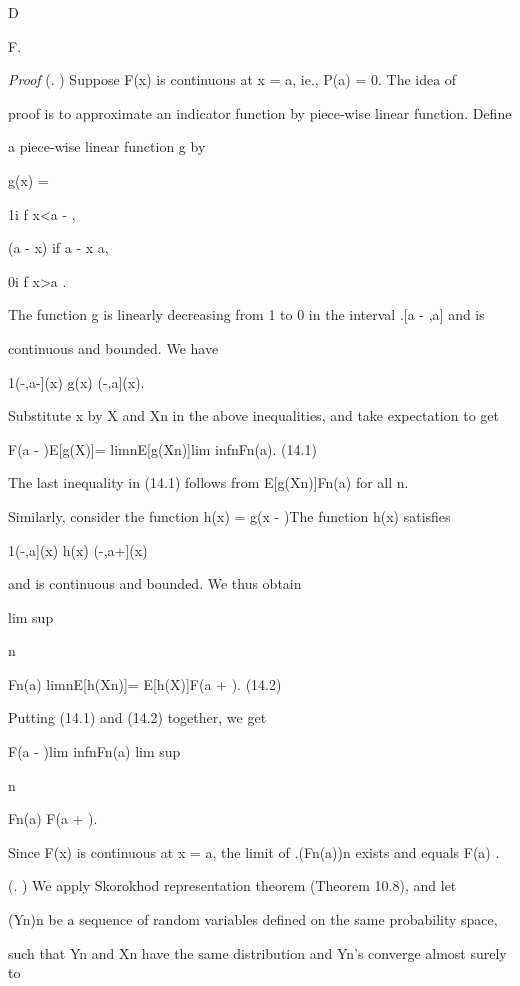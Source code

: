 D

\to F.

\textit{Proof} (. ) Suppose F(x) is continuous at x = a, ie., P({a}) = 0. The idea of

proof is to approximate an indicator function by piece-wise linear function. Define

a piece-wise linear function g by

g(x) =

1i f x<a - \epsilon,

\epsilon(a - x) if a - \epsilon\leq x \leq a,

0i f x>a .

The function g is linearly decreasing from 1 to 0 in the interval .[a - \epsilon,a] and is

continuous and bounded. We have

1(-\infty ,a-\epsilon](x) \leq g(x) (-\infty ,a](x).

Substitute x by X and Xn in the above inequalities, and take expectation to get

F(a - \epsilon)\leq E[g(X)]= limn\to\infty E[g(Xn)]\leq lim infn\to\infty Fn(a). (14.1)

The last inequality in (14.1) follows from E[g(Xn)]\leq Fn(a) for all n.

Similarly, consider the function h(x) = g(x - \epsilon)The function h(x) satisfies

1(-\infty ,a](x) \leq h(x) (-\infty ,a+\epsilon](x)

and is continuous and bounded. We thus obtain

lim sup

n\to\infty

Fn(a) \leq limn\to\infty E[h(Xn)]= E[h(X)]\leq F(a + \epsilon). (14.2)

Putting (14.1) and (14.2) together, we get

F(a - \epsilon)\leq lim infn\to\infty Fn(a) \leq lim sup

n\to\infty

Fn(a) \leq F(a + \epsilon).

Since F(x) is continuous at x = a, the limit of .(Fn(a))n exists and equals F(a) .

(. ) We apply Skorokhod representation theorem (Theorem 10.8), and let

(Yn)n be a sequence of random variables defined on the same probability space,

such that Yn and Xn have the same distribution and Yn's converge almost surely to

